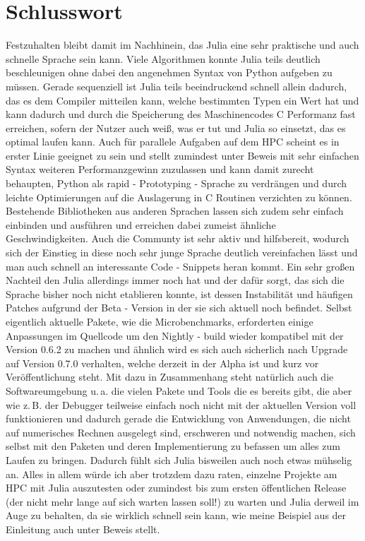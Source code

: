 \documentclass[proseminar,german,utf8]{zihpub}
\newcommand{\zB}[0]{{z.\,B. }}
\newcommand{\ua}[0]{{u.\,a. }}
\begin{document}
\section{Schlusswort}

Festzuhalten bleibt damit im Nachhinein, das Julia eine sehr praktische und auch schnelle Sprache sein kann. Viele Algorithmen konnte Julia teils deutlich beschleunigen ohne dabei den angenehmen Syntax von Python aufgeben zu müssen. Gerade sequenziell ist Julia teils beeindruckend schnell allein dadurch, das es dem Compiler mitteilen kann, welche bestimmten Typen ein Wert hat und kann dadurch und durch die Speicherung des Maschinencodes C Performanz fast erreichen, sofern der Nutzer auch weiß, was er tut und Julia so einsetzt, das es optimal laufen kann. Auch für parallele Aufgaben auf dem HPC scheint es in erster Linie geeignet zu sein und stellt zumindest unter Beweis mit sehr einfachen Syntax weiteren Performanzgewinn zuzulassen und kann damit zurecht behaupten, Python als rapid - Prototyping - Sprache zu verdrängen und durch leichte Optimierungen auf die Auslagerung in C Routinen verzichten zu können. Bestehende Bibliotheken aus anderen Sprachen lassen sich zudem sehr einfach einbinden und ausführen und erreichen dabei zumeist ähnliche Geschwindigkeiten. Auch die Communty ist sehr aktiv und hilfsbereit, wodurch sich der Einstieg in diese noch sehr junge Sprache deutlich vereinfachen lässt und man auch schnell an interessante Code - Snippets heran kommt. Ein sehr großen Nachteil den Julia allerdings immer noch hat und der dafür sorgt, das sich die Sprache bisher noch nicht etablieren konnte, ist dessen Instabilität und häufigen Patches aufgrund der Beta - Version in der sie sich aktuell noch befindet. Selbst eigentlich aktuelle Pakete, wie die Microbenchmarks, erforderten einige Anpassungen im Quellcode um den Nightly - build wieder kompatibel mit der Version 0.6.2 zu machen und ähnlich wird es sich auch sicherlich nach Upgrade auf Version 0.7.0 verhalten, welche derzeit in der Alpha ist und kurz vor Veröffentlichung steht. Mit dazu in Zusammenhang steht natürlich auch die Softwareumgebung \ua die vielen Pakete und Tools die es bereits gibt, die aber wie \zB der Debugger teilweise einfach noch nicht mit der aktuellen Version voll funktionieren und dadurch gerade die Entwicklung von Anwendungen, die nicht auf numerisches Rechnen ausgelegt sind, erschweren und notwendig machen, sich selbst mit den Paketen und deren Implementierung zu befassen um alles zum Laufen zu bringen. Dadurch fühlt sich Julia bisweilen auch noch etwas mühselig an. Alles in allem würde ich aber trotzdem dazu raten, einzelne Projekte am HPC mit Julia auszutesten oder zumindest bis zum ersten öffentlichen Release (der nicht mehr lange auf sich warten lassen soll!) zu warten und Julia derweil im Auge zu behalten, da sie wirklich schnell sein kann, wie meine Beispiel aus der Einleitung auch unter Beweis stellt.
\end{document}
